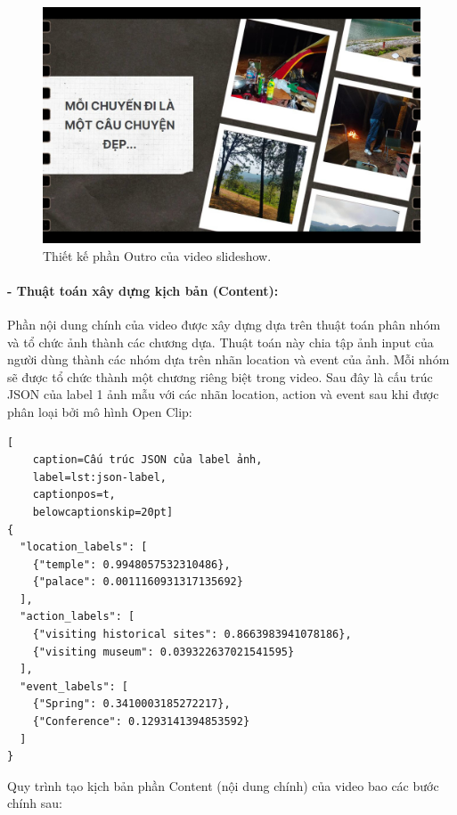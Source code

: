 \begin{enumerate}
    \begin{figure}[H]
        \centering  
        \includegraphics[width=1\textwidth]{figures/c4/4_1/outro.jpg}
        \caption{Thiết kế phần Outro của video slideshow.}
        \label{fig:video-outro-design}
    \end{figure}
\end{enumerate}

\paragraph{- Thuật toán xây dựng kịch bản (Content):}
Phần nội dung chính của video được xây dựng dựa trên thuật toán phân nhóm và tổ chức ảnh thành các chương dựa. Thuật toán này chia tập ảnh input của người dùng thành các nhóm dựa trên nhãn location và event của ảnh. Mỗi nhóm sẽ được tổ chức thành một chương riêng biệt trong video. Sau đây là cấu trúc JSON của label 1 ảnh mẫu với các nhãn location, action và event sau khi được phân loại bởi mô hình Open Clip:

\lstset{language=json}
\begin{lstlisting}[
    caption=Cấu trúc JSON của label ảnh,
    label=lst:json-label,
    captionpos=t,
    belowcaptionskip=20pt]
{
  "location_labels": [
    {"temple": 0.9948057532310486},
    {"palace": 0.0011160931317135692}
  ],
  "action_labels": [
    {"visiting historical sites": 0.8663983941078186},
    {"visiting museum": 0.039322637021541595}
  ],
  "event_labels": [
    {"Spring": 0.3410003185272217},
    {"Conference": 0.1293141394853592}
  ]
}
\end{lstlisting}

Quy trình tạo kịch bản phần Content (nội dung chính) của video bao các bước chính sau:

